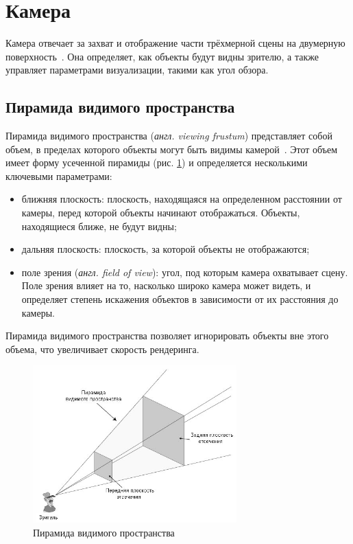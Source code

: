 \section{Камера}

Камера отвечает за захват и отображение части трёхмерной сцены на двумерную поверхность~\cite{lit12}. Она определяет, как объекты будут видны зрителю, а также управляет параметрами визуализации, такими как угол обзора.

\subsection{Пирамида видимого пространства}

Пирамида видимого пространства (\textit{англ. viewing frustum}) представляет собой объем, в пределах которого объекты могут быть видимы камерой~\cite{lit12}. Этот объем имеет форму усеченной пирамиды (рис. \ref{fig:viewing-frustum}) и определяется несколькими ключевыми параметрами:
\begin{itemize}[label=--]
	\item ближняя плоскость: плоскость, находящаяся на определенном расстоянии от камеры, перед которой объекты начинают отображаться. Объекты, находящиеся ближе, не будут видны;
	\item дальняя плоскость: плоскость, за которой объекты не отображаются;
	\item поле зрения (\textit{англ. field of view}): угол, под которым камера охватывает сцену. Поле зрения влияет на то, насколько широко камера может видеть, и определяет степень искажения объектов в зависимости от их расстояния до камеры.
\end{itemize}

Пирамида видимого пространства позволяет игнорировать объекты вне этого объема, что увеличивает скорость рендеринга.

\clearpage

\begin{figure}[h] 
	\centering
	\includegraphics[width=0.7\textwidth]{images/viewing-frustum.png}
	\caption{Пирамида видимого пространства} 
	\label{fig:viewing-frustum} 
\end{figure}

